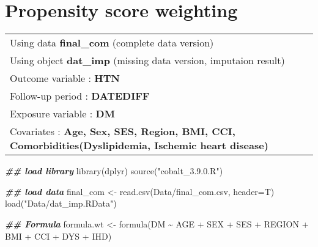 \documentclass[
]{book}
\newenvironment{Shaded}{\begin{snugshade}}{\end{snugshade}}
\newcommand{\AttributeTok}[1]{\textcolor[rgb]{0.77,0.63,0.00}{#1}}
\newcommand{\DocumentationTok}[1]{\textcolor[rgb]{0.56,0.35,0.01}{\textbf{\textit{#1}}}}
\newcommand{\FunctionTok}[1]{\textcolor[rgb]{0.00,0.00,0.00}{#1}}
\newcommand{\NormalTok}[1]{#1}
\newcommand{\OtherTok}[1]{\textcolor[rgb]{0.56,0.35,0.01}{#1}}
\newcommand{\SpecialCharTok}[1]{\textcolor[rgb]{0.00,0.00,0.00}{#1}}
\newcommand{\StringTok}[1]{\textcolor[rgb]{0.31,0.60,0.02}{#1}}
\begin{document}
\hypertarget{propensity-score-weighting}{%
\chapter{Propensity score weighting}\label{propensity-score-weighting}}

\begin{longtable}[]{@{}l@{}}
\toprule()
\endhead
Using data \textbf{final\_com} (complete data version) \\
Using object \textbf{dat\_imp} (missing data version, imputaion result) \\
Outcome variable : \textbf{HTN} \\
Follow-up period : \textbf{DATEDIFF} \\
Exposure variable : \textbf{DM} \\
Covariates : \textbf{Age, Sex, SES, Region, BMI, CCI, Comorbidities(Dyslipidemia, Ischemic heart disease)} \\
\bottomrule()
\end{longtable}

\begin{Shaded}
\begin{Highlighting}[]
\DocumentationTok{\#\# load library}
\FunctionTok{library}\NormalTok{(dplyr)}
\FunctionTok{source}\NormalTok{(}\StringTok{"cobalt\_3.9.0.R"}\NormalTok{)}
\end{Highlighting}
\end{Shaded}

\begin{Shaded}
\begin{Highlighting}[]
\DocumentationTok{\#\# load data}
\NormalTok{final\_com }\OtherTok{\textless{}{-}} \FunctionTok{read.csv}\NormalTok{(}\StringTok{\textquotesingle{}Data/final\_com.csv\textquotesingle{}}\NormalTok{, }\AttributeTok{header=}\NormalTok{T)}
\FunctionTok{load}\NormalTok{(}\StringTok{"Data/dat\_imp.RData"}\NormalTok{)}
\end{Highlighting}
\end{Shaded}

\begin{Shaded}
\begin{Highlighting}[]
\DocumentationTok{\#\# Formula}
\NormalTok{formula.wt }\OtherTok{\textless{}{-}} \FunctionTok{formula}\NormalTok{(DM }\SpecialCharTok{\textasciitilde{}}\NormalTok{ AGE }\SpecialCharTok{+}\NormalTok{ SEX }\SpecialCharTok{+}\NormalTok{ SES }\SpecialCharTok{+}\NormalTok{ REGION }\SpecialCharTok{+}\NormalTok{ BMI }\SpecialCharTok{+}\NormalTok{ CCI }\SpecialCharTok{+}\NormalTok{ DYS }\SpecialCharTok{+}\NormalTok{ IHD)}
\end{Highlighting}
\end{Shaded}
\end{document}
